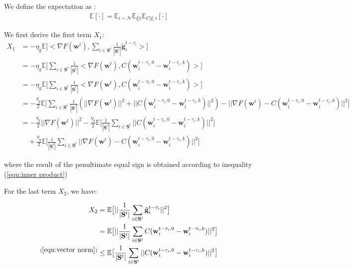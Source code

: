 \documentclass{article}
\begin{document}
We define the expectation as :
\begin{align*}
    \mathbb{E}[\cdot] = \mathbb{E}_{i\sim \mathcal{N}}\mathbb{E}_{\xi|i}\mathbb{E}_{C|\xi,i}[\cdot]
\end{align*}

We first derive the first term $X_1$:
\begin{align*}
X_1 &= - \eta_g \mathbb{E}\big[\big<\nabla F(\mathbf{w}^{t}), \sum_{i \in \mathbf{S}^t} \frac{1}{|\mathbf{S}^t|} \tilde{\mathbf{g}}_i^{t - \tau_i}\big>\big]
\\
&= - \eta_g \mathbb{E}\big[\sum_{i \in \mathbf{S}^t} \frac{1}{|\mathbf{S}^t|}\big<\nabla F(\mathbf{w}^{t}), C(\mathbf{w}_i^{t-\tau_i, 0} - \mathbf{w}_i^{t-\tau_i, k})\big>\big]
\\
&= - \eta_g \mathbb{E}\big[\sum_{i \in \mathbf{S}^t} \frac{1}{|\mathbf{S}^t|}\big<\nabla F(\mathbf{w}^{t}), C(\mathbf{w}_i^{t-\tau_i, 0} - \mathbf{w}_i^{t-\tau_i, k})\big>\big]
\\
&= - \frac{\eta_g}{2} \mathbb{E}\big[\sum_{i \in \mathbf{S}^t} \frac{1}{|\mathbf{S}^t|}(||\nabla F(\mathbf{w}^{t})||^2 + ||C(\mathbf{w}_i^{t-\tau_i, 0} - \mathbf{w}_i^{t-\tau_i, k})||^2) - ||\nabla F(\mathbf{w}^{t}) - C(\mathbf{w}_i^{t-\tau_i, 0} - \mathbf{w}_i^{t-\tau_i, k})||^2\big]
\\
&= - \frac{\eta_g}{2}||\nabla F(\mathbf{w}^{t})||^2 - \frac{\eta_g}{2}\mathbb{E}\big[\frac{1}{|\mathbf{S}^t|}\sum_{i \in \mathbf{S}^t}||C(\mathbf{w}_i^{t-\tau_i, 0} - \mathbf{w}_i^{t-\tau_i, k})||^2\big] 
\\
&\quad + \frac{\eta_g}{2}\mathbb{E}\big[\frac{1}{|\mathbf{S}^t|}\sum_{i \in \mathbf{S}^t}||\nabla F(\mathbf{w}^{t}) - C(\mathbf{w}_i^{t-\tau_i, 0} - \mathbf{w}_i^{t-\tau_i, k})||^2\big]
\end{align*}

where the result of the penultimate equal sign is obtained according to inequality (\ref{equ:inner product})

For the last term $X_2$, we have:

\begin{align*}
X_2 &= \mathbb{E}\big[||\frac{1}{|\mathbf{S}^t|}\sum_{i \in \mathbf{S}^t} \tilde{\mathbf{g}}_i^{t - \tau_i}||^2\big] 
\\
&= \mathbb{E}\big[||\frac{1}{|\mathbf{S}^t|}\sum_{i \in \mathbf{S}^t} C(\mathbf{w}_i^{t-\tau_i, 0} - \mathbf{w}_i^{t-\tau_i, k})||^2\big]
\\
^{(\ref{equ:vector norm})}&\le \mathbb{E}\big[\frac{1}{|\mathbf{S}^t|}\sum_{i \in \mathbf{S}^t}||C(\mathbf{w}_i^{t-\tau_i, 0} - \mathbf{w}_i^{t-\tau_i, k})||^2\big]
\end{align*}
\end{document}
